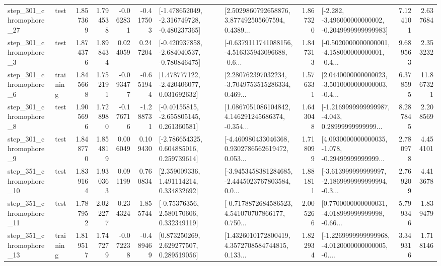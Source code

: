 \begin{tabular}{llrrrrllrlrr}
  step\_301\_chromophore\_27 &      test &      1.857369 &    1.794538 &     -0.062831 & -0.417503 &  [-1.478652049, -2.316749728, -0.480237365] &  [2.5029860792658876, 3.877492505607594, 0.4389... &       1.867320 &  [-2.282, -3.496000000000002, -0.2049999999999983] &            7.124101 &          2.637684 \\
   step\_301\_chromophore\_3 &      test &      1.874376 &    1.898434 &      0.024059 &  0.247204 &  [-0.420937858, -2.684040537, -0.780846475] &  [-0.6379111741088156, -4.516335943096688, -0.6... &       1.847313 &  [-0.5020000000000001, -4.158000000000001, -0.4... &            9.689563 &          2.353232 \\
   step\_301\_chromophore\_6 &  training &      1.845668 &    1.752191 &     -0.093477 & -0.651944 &    [1.478777122, -2.420406077, 0.031692632] &  [2.280762397032234, -3.7049753515286334, 0.469... &       1.576331 &  [2.0440000000000023, -3.5010000000000003, -0.4... &            6.378595 &         11.867321 \\
   step\_301\_chromophore\_8 &      test &      1.905696 &    1.728980 &     -0.176716 & -1.288731 &    [-0.40155815, -2.655805145, 0.261360581] &  [1.0867051086104842, 4.146291245686374, -0.354... &       1.643048 &  [-1.2169999999999987, -4.043, 0.28999999999999... &            8.287845 &          2.208569 \\
   step\_301\_chromophore\_9 &      test &      1.848770 &    1.854819 &      0.006049 &  0.109430 &    [-2.786654325, 0.604885016, 0.259739614] &  [-4.460980433046368, 0.9302786562619472, 0.053... &       1.718099 &  [4.0930000000000035, -1.078, -0.29499999999999... &            2.780978 &          4.454101 \\
  step\_351\_chromophore\_10 &      test &      1.839164 &    1.930363 &      0.091199 &  0.760834 &     [2.359009336, 1.491114214, 0.334832692] &  [-3.9453458381284685, -2.4445023767803584, 0.0... &       1.881811 &  [-3.613999999999997, -2.1869999999999994, -0.3... &            2.769209 &          4.413678 \\
  step\_351\_chromophore\_11 &      test &      1.787952 &    2.022277 &      0.234324 &  1.855744 &     [-0.75376356, 2.580170606, 0.332349119] &  [-0.7178872684586523, 4.541070707866177, 0.750... &       2.005266 &  [0.7700000000000031, -4.018999999999998, -0.66... &            5.799346 &          1.839479 \\
  step\_351\_chromophore\_13 &  training &      1.819517 &    1.747279 &     -0.072238 & -0.489469 &     [0.873250269, 2.629277507, 0.289519056] &  [1.4326010172800419, 4.3572708584744815, 0.133... &       1.822934 &  [-1.2269999999999968, -4.0120000000000005, -0.... &            3.349316 &          1.718146 \\

\end{tabular}
